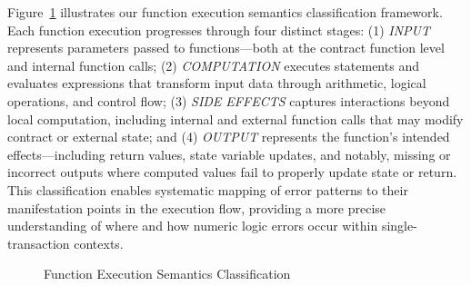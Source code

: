 \documentclass[pdflatex,sn-basic]{sn-jnl}%
\theoremstyle{thmstyleone}%
\theoremstyle{thmstyletwo}%
\theoremstyle{thmstylethree}%
\begin{document}
Figure~\ref{fig:execution_semantics} illustrates our function execution semantics classification framework.
Each function execution progresses through four distinct stages:
(1) \textit{INPUT} represents parameters passed to functions---both at the contract function level and internal function calls;
(2) \textit{COMPUTATION} executes statements and evaluates expressions that transform input data through arithmetic, logical operations, and control flow;
(3) \textit{SIDE EFFECTS} captures interactions beyond local computation, including internal and external function calls that may modify contract or external state;
and (4) \textit{OUTPUT} represents the function's intended effects---including return values, state variable updates, and notably, missing or incorrect outputs where computed values fail to properly update state or return.
This classification enables systematic mapping of error patterns to their manifestation points in the execution flow,
providing a more precise understanding of where and how numeric logic errors occur within single-transaction contexts.

\begin{figure}[!h]
\centering
{}
\caption{Function Execution Semantics Classification}
\label{fig:execution_semantics}
\end{figure}
\end{document}
